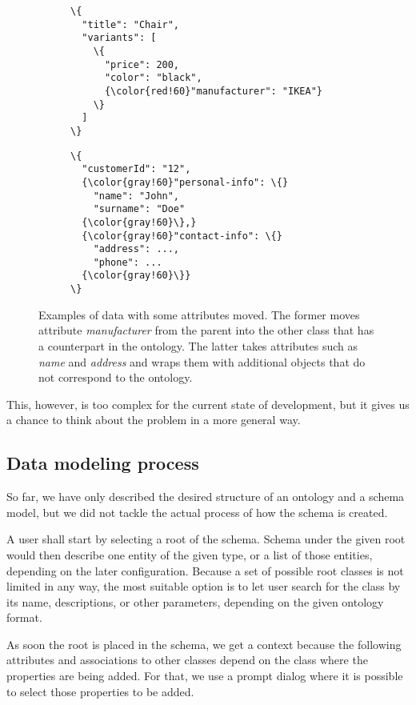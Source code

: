 \begin{figure}[h!]\centering
  \begin{subfigure}[b]{.5\textwidth}
    \begin{Verbatim}[commandchars=\\\{\}]
\{
  "title": "Chair",
  "variants": [
    \{
      "price": 200,
      "color": "black",
      {\color{red!60}"manufacturer": "IKEA"}
    \}
  ]
\}
    \end{Verbatim}
  \end{subfigure}%
  \begin{subfigure}[b]{.5\textwidth}
    \begin{Verbatim}[commandchars=\\\{\}]
\{
  "customerId": "12",
  {\color{gray!60}"personal-info": \{}
    "name": "John",
    "surname": "Doe"
  {\color{gray!60}\},}
  {\color{gray!60}"contact-info": \{}
    "address": ...,
    "phone": ...
  {\color{gray!60}\}}
\}
    \end{Verbatim}
    \end{subfigure}%
  \caption{Examples of data with some attributes moved. The former moves attribute \textit{manufacturer} from the parent into the other class that has a counterpart in the ontology. The latter takes attributes such as \textit{name} and \textit{address} and wraps them with additional objects that do not correspond to the ontology.}
\end{figure}

This, however, is too complex for the current state of development, but it gives us a chance to think about the problem in a more general way.

\subsection{Data modeling process}

So far, we have only described the desired structure of an ontology and a schema model, but we did not tackle the actual process of how the schema is created.

A user shall start by selecting a root of the schema. Schema under the given root would then describe one entity of the given type, or a list of those entities, depending on the later configuration. Because a set of possible root classes is not limited in any way, the most suitable option is to let user search for the class by its name, descriptions, or other parameters, depending on the given ontology format.

As soon the root is placed in the schema, we get a context because the following attributes and associations to other classes depend on the class where the properties are being added. For that, we use a prompt dialog where it is possible to select those properties to be added.

